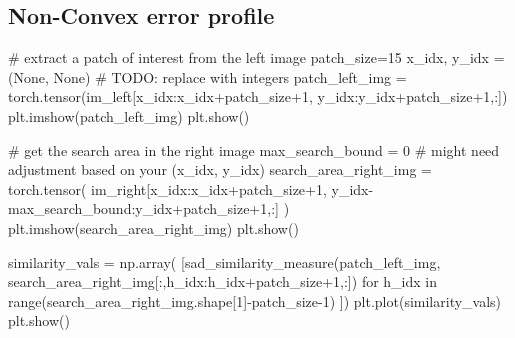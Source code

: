 \documentclass[
  letterpaper,
  DIV=11,
  numbers=noendperiod]{scrartcl}
\newenvironment{Shaded}{\begin{snugshade}}{\end{snugshade}}
\newcommand{\AlertTok}[1]{\textcolor[rgb]{0.68,0.00,0.00}{#1}}
\newcommand{\BuiltInTok}[1]{\textcolor[rgb]{0.00,0.23,0.31}{#1}}
\newcommand{\CommentTok}[1]{\textcolor[rgb]{0.37,0.37,0.37}{#1}}
\newcommand{\ControlFlowTok}[1]{\textcolor[rgb]{0.00,0.23,0.31}{#1}}
\newcommand{\DecValTok}[1]{\textcolor[rgb]{0.68,0.00,0.00}{#1}}
\newcommand{\KeywordTok}[1]{\textcolor[rgb]{0.00,0.23,0.31}{#1}}
\newcommand{\NormalTok}[1]{\textcolor[rgb]{0.00,0.23,0.31}{#1}}
\newcommand{\OperatorTok}[1]{\textcolor[rgb]{0.37,0.37,0.37}{#1}}
\newcommand{\VariableTok}[1]{\textcolor[rgb]{0.07,0.07,0.07}{#1}}
\begin{document}
\hypertarget{non-convex-error-profile}{%
\subsection{Non-Convex error profile}\label{non-convex-error-profile}}

\begin{Shaded}
\begin{Highlighting}[]
\CommentTok{\# extract a patch of interest from the left image}
\NormalTok{patch\_size}\OperatorTok{=}\DecValTok{15}
\NormalTok{x\_idx, y\_idx }\OperatorTok{=}\NormalTok{ (}\VariableTok{None}\NormalTok{, }\VariableTok{None}\NormalTok{) }\CommentTok{\# }\AlertTok{TODO}\CommentTok{: replace with integers}
\NormalTok{patch\_left\_img }\OperatorTok{=}\NormalTok{ torch.tensor(im\_left[x\_idx:x\_idx}\OperatorTok{+}\NormalTok{patch\_size}\OperatorTok{+}\DecValTok{1}\NormalTok{, y\_idx:y\_idx}\OperatorTok{+}\NormalTok{patch\_size}\OperatorTok{+}\DecValTok{1}\NormalTok{,:])}
\NormalTok{plt.imshow(patch\_left\_img)}
\NormalTok{plt.show()}
\end{Highlighting}
\end{Shaded}

\begin{Shaded}
\begin{Highlighting}[]
\CommentTok{\# get the search area in the right image}
\NormalTok{max\_search\_bound }\OperatorTok{=} \DecValTok{0} \CommentTok{\# might need adjustment based on your (x\_idx, y\_idx)}
\NormalTok{search\_area\_right\_img }\OperatorTok{=}\NormalTok{ torch.tensor(}
\NormalTok{  im\_right[x\_idx:x\_idx}\OperatorTok{+}\NormalTok{patch\_size}\OperatorTok{+}\DecValTok{1}\NormalTok{, y\_idx}\OperatorTok{{-}}\NormalTok{max\_search\_bound:y\_idx}\OperatorTok{+}\NormalTok{patch\_size}\OperatorTok{+}\DecValTok{1}\NormalTok{,:]}
\NormalTok{)}
\NormalTok{plt.imshow(search\_area\_right\_img)}
\NormalTok{plt.show()}
\end{Highlighting}
\end{Shaded}

\begin{Shaded}
\begin{Highlighting}[]
\NormalTok{similarity\_vals }\OperatorTok{=}\NormalTok{ np.array(}
\NormalTok{  [sad\_similarity\_measure(patch\_left\_img, search\_area\_right\_img[:,h\_idx:h\_idx}\OperatorTok{+}\NormalTok{patch\_size}\OperatorTok{+}\DecValTok{1}\NormalTok{,:]) }
   \ControlFlowTok{for}\NormalTok{ h\_idx }\KeywordTok{in} \BuiltInTok{range}\NormalTok{(search\_area\_right\_img.shape[}\DecValTok{1}\NormalTok{]}\OperatorTok{{-}}\NormalTok{patch\_size}\OperatorTok{{-}}\DecValTok{1}\NormalTok{)}
\NormalTok{  ])}
\NormalTok{plt.plot(similarity\_vals)}
\NormalTok{plt.show()}
\end{Highlighting}
\end{Shaded}
\end{document}

